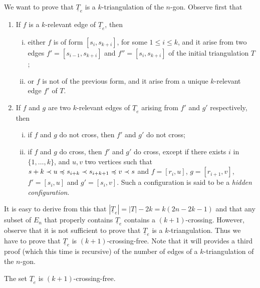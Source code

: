 \documentclass[12pt]{amsart}
\begin{document}
\medskip
We want to prove that $\underline{T}_e$ is a $k$-triangulation of the $n$-gon. Observe first that
\begin{enumerate}
\item If $f$ is a $k$-relevant edge of $\underline{T}_e$, then
\begin{enumerate}[(i)]
\item either $f$ is of form $[s_i,s_{k+i}]$, for some $1\le i\le k$, and it arise from two edges $f'=[s_{i-1},s_{k+i}]$ and $f''=[s_i,s_{k+i}]$ of the initial triangulation $T$;
\item or $f$ is not of the previous form, and it arise from a unique $k$-relevant edge $f'$ of $T$.
\end{enumerate}

\item If $f$ and $g$ are two $k$-relevant edges of $\underline{T}_e$ arising from $f'$ and $g'$ respectively, then
\begin{enumerate}[(i)]
\item if $f$ and $g$ do not cross, then $f'$ and $g'$ do not cross; 
\item if $f$ and $g$ do cross, then $f'$ and $g'$ do cross, except if there exists $i$ in $\{1,\ldots,k\}$, and $u,v$ two vertices such that $s+k\prec u\preccurlyeq s_{i+k}\prec s_{i+k+1}\preccurlyeq v\prec s$ and $f=[r_i,u]$, $g=[r_{i+1},v]$, $f'=[s_i,u]$ and $g'=[s_i,v]$. Such a configuration is said to be a \emph{hidden configuration}.
\end{enumerate}
\end{enumerate}

It is easy to derive from this that $|\underline{T}_e|=|T|-2k=k(2n-2k-1)$ and that any subset of $E_n$ that properly contains $\underline{T}_e$ contains a $(k+1)$-crossing. However, observe that it is not sufficient to prove that $\underline{T}_e$ is a $k$-triangulation. Thus we have to prove that $\underline{T}_e$ is $(k+1)$-crossing-free. Note that it will provides a third proof (which this time is recursive) of the number of edges of a $k$-triangulation of the $n$-gon.

\begin{lemma}
The set $\underline{T}_e$ is $(k+1)$-crossing-free.
\end{lemma}
\end{document}
